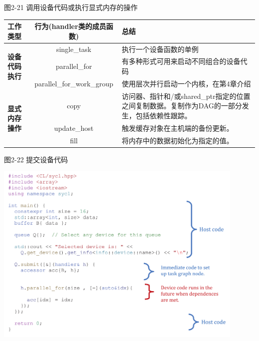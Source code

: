 图2-21 调用设备代码或执行显式内存的操作
\begin{table}[]
	\begin{tabular}{|m{32mm}|c|p{6cm}|}
		\hline
		\multicolumn{1}{|l|}{\textbf{工作类型}}            & \multicolumn{1}{|c|}{\textbf{行为(handler类的成员函数)}} & \textbf{总结}                                                                                                                                   \\ \hline
		\multirow{3}{10em}{\textbf{设备代码执行}}     & single\_task                                                 & 执行一个设备函数的单例                                                                                                   \\ \cline{2-3} 
		& parallel\_for                                                & 有多种形式可用来启动不同组合的设备代码                                                       \\ \cline{2-3} 
		& parallel\_for\_work\_group                                   & 使用层次并行启动一个内核，在第4章介绍                                                                       \\ \hline
		\multirow{3}{10em}{\textbf{显式内存操作}} & copy                                                         & 访问器、指针和/或shared\_ptr指定的位置之间复制数据。复制作为DAG的一部分发生，包括依赖性跟踪。 \\ \cline{2-3} 
		& update\_host                                                 & 触发缓存对象在主机端的备份更新。                                                                                          \\ \cline{2-3} 
		& fill                                                         & 将内存中的数据初始化为指定的值。                                                                                               \\ \hline
	\end{tabular}
\end{table}

\hspace*{\fill} \par %
图2-22 提交设备代码
\begin{center}
	\includegraphics[width=0.9\textwidth]{content/chapter-2/images/12}
\end{center}

